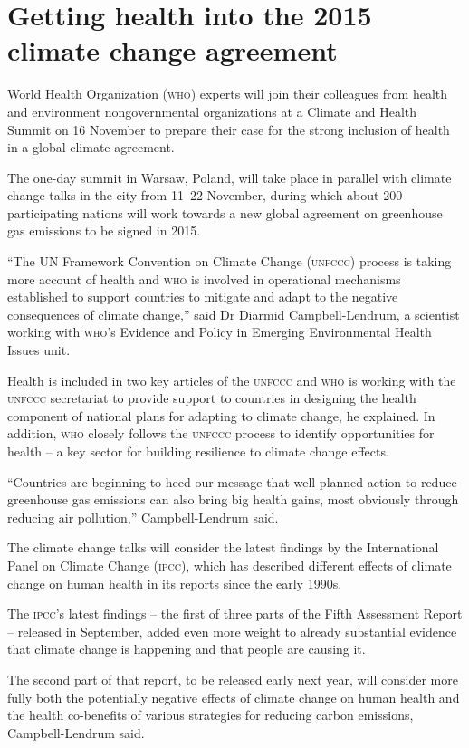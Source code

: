\documentclass{article}
\begin{document}
\section{Getting health into the 2015 climate change agreement}

World Health Organization (\textsc{who}) experts will join their colleagues from health
and environment
nongovernmental organizations at a Climate and Health Summit on 16 November to
prepare their case
for the strong inclusion of health in a global climate agreement.

The one-day summit in Warsaw, Poland, will take place in parallel with climate
change talks in
the city from 11–22 November, during which about 200 participating nations will
work towards
a new global agreement on greenhouse gas emissions to be signed in 2015.

“The UN Framework Convention on Climate Change (\textsc{unfccc}) process is taking more
account of
health and \textsc{who} is involved in operational mechanisms established to support
countries to mitigate
and adapt to the negative consequences of climate change,” said Dr Diarmid
Campbell-Lendrum, a scientist working with \textsc{who}'s Evidence and Policy in Emerging
Environmental Health Issues unit.

Health is included in two key articles of the \textsc{unfccc} and \textsc{who} is working with the
\textsc{unfccc}
secretariat to provide support to countries in designing the health component of
national plans for
adapting to climate change, he explained. In addition, \textsc{who} closely follows the
\textsc{unfccc} process to
identify opportunities for health – a key sector for building resilience to
climate change
effects.

“Countries are beginning to heed our message that well planned action to reduce
greenhouse
gas emissions can also bring big health gains, most obviously through reducing
air
pollution,” Campbell-Lendrum said.

The climate change talks will consider the latest findings by the International
Panel on Climate
Change (\textsc{ipcc}), which has described different effects of climate change on human
health in its
reports since the early 1990s.

The \textsc{ipcc}'s latest findings – the first of three parts of the Fifth Assessment
Report – released in September, added even more weight to already substantial
evidence that
climate change is happening and that people are causing it.

The second part of that report, to be released early next year, will consider
more fully both the
potentially negative effects of climate change on human health and the health
co-benefits of various
strategies for reducing carbon emissions, Campbell-Lendrum said.
\end{document}
